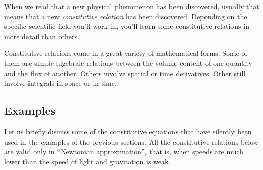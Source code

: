 \documentclass[a4paper,12pt,%
onecolumn,oneside,%
british%
]{memoir}
\renewcommand*{\|}[1][]{\nonscript\:#1\vert\nonscript\:\mathopen{}}
\begin{document}
When we read that a new physical phenomenon has been discovered, usually that means that a new \emph{constitutive relation} has been discovered. Depending on the specific scientific field you'll work in, you'll learn some constitutive relations in more detail than others.

Constitutive relations come in a great variety of mathematical forms. Some of them are simple algebraic relations between the volume content of one quantity and the flux of another. Others involve spatial or time derivatives. Other still involve integrals in space or in time.%

\subsection{Examples}
\label{sec:example_constitutive}

Let us briefly discuss some of the constitutive equations that have silently been used in the examples of the previous sections. All the constitutive relations below are valid only in \enquote{Newtonian approximation}, that is, when speeds are much lower than the speed of light and gravitation is weak.
\end{document}
